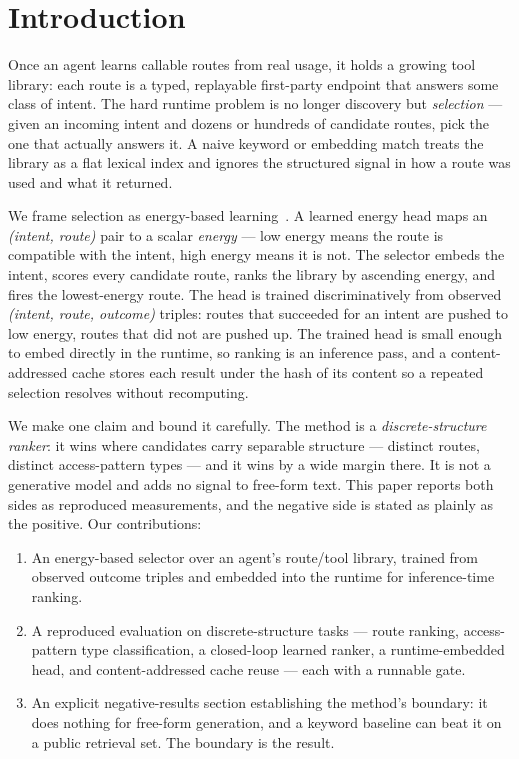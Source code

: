 \documentclass[11pt]{article}
\begin{document}
\section{Introduction}
Once an agent learns callable routes from real usage, it holds a growing tool
library: each route is a typed, replayable first-party endpoint that answers some
class of intent. The hard runtime problem is no longer discovery but
\emph{selection} --- given an incoming intent and dozens or hundreds of candidate
routes, pick the one that actually answers it. A naive keyword or embedding match
treats the library as a flat lexical index and ignores the structured signal in
how a route was used and what it returned.

We frame selection as energy-based learning~\cite{lecun}. A learned energy head
maps an \emph{(intent, route)} pair to a scalar \emph{energy} --- low energy means
the route is compatible with the intent, high energy means it is not. The selector
embeds the intent, scores every candidate route, ranks the library by ascending
energy, and fires the lowest-energy route. The head is trained discriminatively
from observed \emph{(intent, route, outcome)} triples: routes that succeeded for
an intent are pushed to low energy, routes that did not are pushed up. The trained
head is small enough to embed directly in the runtime, so ranking is an inference
pass, and a content-addressed cache stores each result under the hash of its
content so a repeated selection resolves without recomputing.

We make one claim and bound it carefully. The method is a \emph{discrete-structure
ranker}: it wins where candidates carry separable structure --- distinct routes,
distinct access-pattern types --- and it wins by a wide margin there. It is not a
generative model and adds no signal to free-form text. This paper reports both
sides as reproduced measurements, and the negative side is stated as plainly as the
positive. Our contributions:
\begin{enumerate}[leftmargin=1.6em]
  \item An energy-based selector over an agent's route/tool library, trained from
  observed outcome triples and embedded into the runtime for inference-time
  ranking.
  \item A reproduced evaluation on discrete-structure tasks --- route ranking,
  access-pattern type classification, a closed-loop learned ranker, a
  runtime-embedded head, and content-addressed cache reuse --- each with a runnable
  gate.
  \item An explicit negative-results section establishing the method's boundary:
  it does nothing for free-form generation, and a keyword baseline can beat it on a
  public retrieval set. The boundary is the result.
\end{enumerate}
\end{document}
